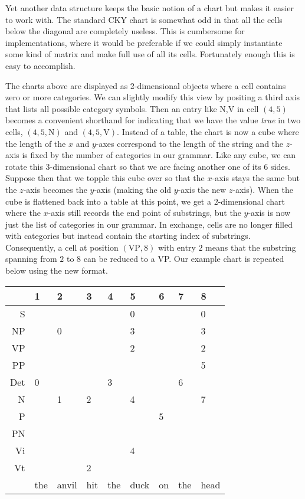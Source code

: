 Yet another data structure keeps the basic notion of a chart but makes it easier to work with.
The standard CKY chart is somewhat odd in that all the cells below the diagonal are completely useless.
This is cumbersome for implementations, where it would be preferable if we could simply instantiate some kind of matrix and make full use of all its cells.
Fortunately enough this is easy to accomplish.

The charts above are displayed as 2-dimensional objects where a cell contains zero or more categories.
We can slightly modify this view by positing a third axis that lists all possible category symbols.
Then an entry like N,V in cell $(4,5)$ becomes a convenient shorthand for indicating that we have the value \emph{true} in two cells, $(4,5,\mathrm{N})$ and $(4,5,\mathrm{V})$.
Instead of a table, the chart is now a cube where the length of the $x$ and $y$-axes correspond to the length of the string and the $z$-axis is fixed by the number of categories in our grammar.
Like any cube, we can rotate this 3-dimensional chart so that we are facing another one of its $6$ sides.
Suppose then that we topple this cube over so that the $x$-axis stays the same but the $z$-axis becomes the $y$-axis (making the old $y$-axis the new $z$-axis).
When the cube is flattened back into a table at this point, we get a $2$-dimensional chart where the $x$-axis still records the end point of substrings, but the $y$-axis is now just the list of categories in our grammar.
In exchange, cells are no longer filled with categories but instead contain the starting index of substrings.
Consequently, a cell at position $(\mathrm{VP},8)$ with entry $2$ means that the substring spanning from $2$ to $8$ can be reduced to a VP\@.
Our example chart is repeated below using the new format.
%
\begin{center}
    \begin{tabular}{r | C{3em} C{3em} C{3em} C{3em} C{3em} C{3em} C{3em} C{3em} |}
          & 1 & 2 & 3 & 4 & 5 & 6 & 7 & 8\\
          \hline
        S & & & & & 0 & & & 0\\
       NP & & 0 & & & 3 & & & 3\\
       VP & & & & & 2 & & & 2\\
       PP & & & & & & & & 5\\
      Det & 0& & & 3 & & & 6 & \\
       N  & & 1 & 2 & & 4 & & & 7 \\
       P  & & & & & & 5 & & \\
       PN & & & & & & & & \\
       Vi & & & & & 4 & & & \\
       Vt & & & 2 & & & & & \\
          \hline
          & the & anvil & hit & the & duck & on & the & head\\
    \end{tabular}
\end{center}

